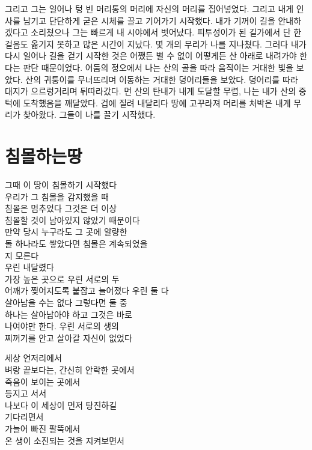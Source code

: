 \begin{article}
그리고 그는 일어나 텅 빈 머리통의 머리에 자신의 머리를 집어넣었다. 그리고 내게 인사를 남기고 단단하게 굳은 시체를 끌고 기어가기 시작했다. 내가 기꺼이 길을 안내하겠다고 소리쳤으나 그는 빠르게 내 시야에서 벗어났다. 피투성이가 된 길가에서 단 한 걸음도 옮기지 못하고 많은 시간이 지났다. 몇 개의 무리가 나를 지나쳤다. 그러다 내가 다시 일어나 길을 걷기 시작한 것은 어쨌든 별 수 없이 어떻게든 산 아래로 내려가야 한다는 판단 때문이었다. 어둠의 정오에서 나는 산의 골을 따라 움직이는 거대한 빛을 보았다. 산의 귀퉁이를 무너뜨리며 이동하는 거대한 덩어리들을 보았다. 덩어리를 따라 대지가 으르렁거리며 뒤따라갔다. 먼 산의 탄내가 내게 도달할 무렵, 나는 내가 산의 중턱에 도착했음을 깨달았다. 겁에 질려 내달리다 땅에 고꾸라져 머리를 처박은 내게 무리가 찾아왔다. 그들이 나를 끌기 시작했다.
\end{article}

\begin{article}
\hypertarget{uxce68uxbab0uxd558uxb294uxb545}{%
\chapter{침몰하는땅}\label{uxce68uxbab0uxd558uxb294uxb545}}

그때 이 땅이 침몰하기 시작했다\\
우리가 그 침몰을 감지했을 때\\
침몰은 멈추었다 그것은 더 이상\\
침몰할 것이 남아있지 않았기 때문이다\\
만약 당시 누구라도 그 곳에 알량한\\
돌 하나라도 쌓았다면 침몰은 계속되었을\\
지 모른다\\
우린 내달렸다\\
가장 높은 곳으로 우린 서로의 두\\
어깨가 찢어지도록 붙잡고 늘어졌다 우린 둘 다\\
살아남을 수는 없다 그렇다면 둘 중\\
하나는 살아남아야 하고 그것은 바로\\
나여야만 한다. 우린 서로의 생의\\
찌꺼기를 안고 살아갈 자신이 없었다

세상 언저리에서\\
벼랑 끝보다는, 간신히 안락한 곳에서\\
죽음이 보이는 곳에서\\
등지고 서서\\
나보다 이 세상이 먼저 탕진하길\\
기다리면서\\
가늘어 빠진 팔뚝에서\\
온 생이 소진되는 것을 지켜보면서
\end{article}

